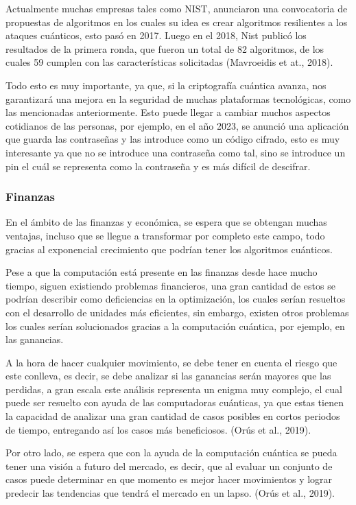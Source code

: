 \documentclass[twoside]{article}
\begin{document}
Actualmente muchas empresas tales como NIST, anunciaron una convocatoria de propuestas de algoritmos en los cuales su idea es crear algoritmos resilientes a los ataques cuánticos, esto pasó en 2017. Luego en el 2018, Nist publicó los resultados de la primera ronda, que fueron un total de 82 algoritmos, de los cuales 59 cumplen con las características solicitadas (Mavroeidis et at., 2018). 

Todo esto es muy importante, ya que, si la criptografía cuántica avanza, nos garantizará una mejora en la seguridad de muchas plataformas tecnológicas, como las mencionadas anteriormente. Esto puede llegar a cambiar muchos aspectos cotidianos de las personas, por ejemplo, en el año 2023, se anunció una aplicación que guarda las contraseñas y las introduce como un código cifrado, esto es muy interesante ya que no se introduce una contraseña como tal, sino se introduce un pin el cuál se representa como la contraseña y es más difícil de descifrar. 

 \subsubsection{Finanzas} 
 En el ámbito de las finanzas y económica, se espera que se obtengan muchas ventajas, incluso que se llegue a transformar por completo este campo, todo gracias al exponencial crecimiento que podrían tener los algoritmos cuánticos.
 
Pese a que la computación está presente en las finanzas desde hace mucho tiempo, siguen existiendo problemas financieros, una gran cantidad de estos se podrían describir como deficiencias en la optimización, los cuales serían resueltos con el desarrollo de unidades más eficientes, sin embargo, existen otros problemas los cuales serían solucionados gracias a la computación cuántica, por ejemplo, en las ganancias. 

A la hora de hacer cualquier movimiento, se debe tener en cuenta el riesgo que este conlleva, es decir, se debe analizar si las ganancias serán mayores que las perdidas, a gran escala este análisis representa un enigma muy complejo, el cual puede ser resuelto con ayuda de las computadoras cuánticas, ya que estas tienen la capacidad de analizar una gran cantidad de casos posibles en cortos periodos de tiempo, entregando así los casos más beneficiosos. (Orús et al., 2019).

Por otro lado, se espera que con la ayuda de la computación cuántica se pueda tener una visión a futuro del mercado, es decir, que al evaluar un conjunto de casos puede determinar en que momento es mejor hacer movimientos y lograr predecir las tendencias que tendrá el mercado en un lapso. (Orús et al., 2019).
\end{document}

